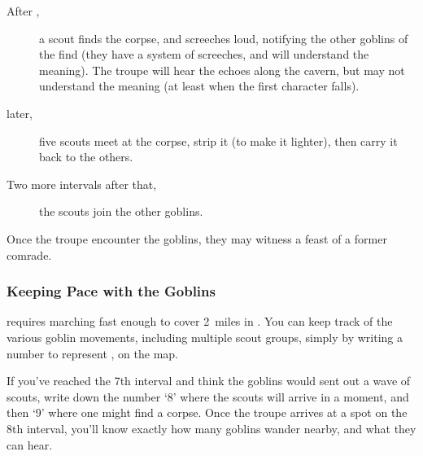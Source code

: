 \begin{multicols}{2}
\begin{description}
  \item[After ,]
  a scout finds the corpse, and screeches loud, notifying the other goblins of the find (they have a system of screeches, and will understand the meaning).
  The troupe will hear the echoes along the cavern, but may not understand the meaning (at least when the first character falls).
  \item[ later,]
  five scouts meet at the corpse, strip it (to make it lighter), then carry it back to the others.
  \item[Two more \glspl{interval} after that,]
  the scouts join the other goblins.
\end{description}

Once the troupe encounter the goblins, they may witness a feast of a former comrade.

\subsubsection{Keeping Pace with the Goblins}
requires marching fast enough to cover 2~miles in .
You can keep track of the various goblin movements, including multiple scout groups, simply by writing a number to represent , on the map.

If you've reached the 7th \gls{interval} and think the goblins would sent out a wave of scouts, write down the number `8' where the scouts will arrive in a moment, and then `9' where one might find a corpse.
Once the troupe arrives at a spot on the 8th \gls{interval}, you'll know exactly how many goblins wander nearby, and what they can hear.

\end{multicols}

